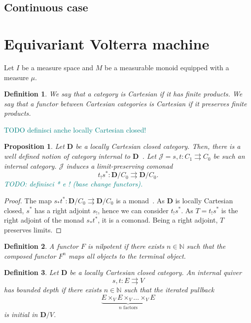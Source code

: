\documentclass[12pt]{article}
\newtheorem{definition}{Definition}
\newtheorem{proposition}{Proposition}
\newcommand{\pietro}[1]{\textcolor{teal}{#1}}
\newcommand{\N}{{\mathbb{N}}}
\newcommand{\DCat}{{\mathbf{D}}}
\newcommand{\JCat}{{\mathcal{J}}}
\begin{document}
\subsection{Continuous case}

\section{Equivariant Volterra machine}

Let $I$ be a measure space and $M$ be a measurable monoid equipped with a measure $\mu$.

\begin{definition}\label{def:cartesian_category}
    We say that a category is {\em Cartesian} if it has finite products. We say that a functor between Cartesian categories is {\em Cartesian} if it preserves finite products.
\end{definition}

\pietro{TODO definisci anche locally Cartesian closed!}

\begin{proposition}\label{prop:internal_category_comonad}
    Let $\DCat$ be a locally Cartesian closed category. Then, there is a well defined notion of category {\em internal} to $\DCat$~\cite{mac2013categories}.
    Let $\JCat = s, t \colon C_1 \rightrightarrows C_0$ be such an internal category. $\JCat$ induces a limit-preserving comonad
    \begin{equation*}
        t_!s^*\colon \DCat/C_0 \rightrightarrows \DCat/C_0.
    \end{equation*}
    \pietro{TODO: definisci * e ! (base change functors).}
\end{proposition}

\begin{proof}
    The map $s_*t^*\colon \DCat/C_0 \rightrightarrows \DCat/C_0$ is a monad~\cite[Thm.~V.8.2]{Mac_Lane_1994}. As $\DCat$ is locally Cartesian closed, $s^*$ has a right adjoint $s_!$, hence we can consider $t_!s^*$. As $T = t_!s^*$ is the right adjoint of the monad $s_*t^*$, it is a comonad. Being a right adjoint, $T$ preserves limits.
\end{proof}

\begin{definition}\label{def:nilpotent_functor}
    A functor $F$ is {\em nilpotent} if there exists $n \in \N$ such that the composed functor $F^n$ maps all objects to the terminal object.
\end{definition}

\begin{definition}\label{def:internal_quiver_bounded_depth}
    Let $\DCat$ be a locally Cartesian closed category. An internal quiver
    \begin{equation*}
        s, t\colon E \rightrightarrows V
    \end{equation*}
    {\em has bounded depth} if there exists $n \in \N$ such that the iterated pullback
    \begin{equation}\label{eq:nilpotent_left_adjoint}
        \underbrace{E \times_V E \times_V \dots \times_V E}_{n \text{ factors}}
    \end{equation}
    is initial in $\DCat/V$.
\end{definition}
\end{document}
